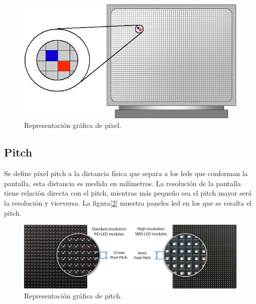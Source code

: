 \begin{figure}[htpb]
	\centering
	\includegraphics[scale=0.3]{Figures/pixel-definicion.jpg} 
	\caption{Representación gráfica de píxel\protect\footnotemark.}
	\label{fig:pixelimagen}
\end{figure}

\subsection{Pitch}
Se define píxel pitch a la distancia física que separa a los leds que conforman la pantalla, esta distancia es medida en milímetros. La resolución de la pantalla tiene relación directa con el pitch, mientras más pequeño sea el pitch mayor será la resolución y viceversa\citep{IMAGENDEF2}. La figura[\ref{fig:pixelpitch}] muestra paneles led en los que se resalta el pitch. 

\begin{figure}[htpb]
	\centering
	\includegraphics[scale=0.3]{Figures/pitch.jpg} 
	\caption{Representación gráfica de pitch\protect\footnotemark.}
	\label{fig:pixelpitch}
\end{figure}




